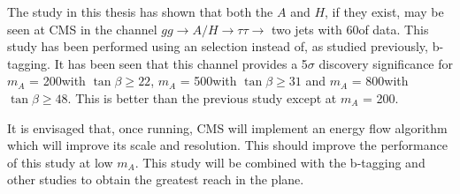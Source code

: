 The study in this thesis has shown that both the $A$ and $H$, if they exist, may be seen at CMS in the channel $gg \rightarrow A/H \rightarrow \tau\tau \rightarrow$ two jets with 60\fb of data. This study has been performed using an \MET selection instead of, as studied previously, b-tagging. It has been seen that this channel provides a 5$\sigma$ discovery significance for $m_A$ = 200\GeVcc with $\tan{\beta} \ge 22$, $m_A$ = 500\GeVcc with $\tan{\beta} \ge 31$ and $m_A$ = 800\GeVcc with $\tan{\beta} \ge 48$. This is better than the previous study except at $m_A$ = 200\GeVcc. 

It is envisaged that, once running, CMS will implement an energy flow algorithm which will improve its \MET scale and resolution. This should improve the performance of this study at low $m_A$. This study will be combined with the b-tagging and other studies to obtain the greatest reach in the \plane plane.